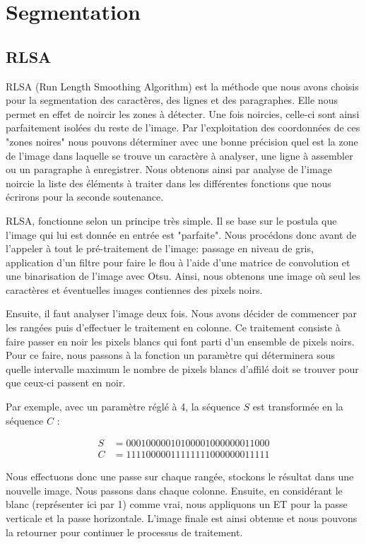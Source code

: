 \documentclass[11pt]{report}
\begin{document}
\section{Segmentation}

\subsection{RLSA}

RLSA (Run Length Smoothing Algorithm) est la méthode que nous avons choisis pour la segmentation des caractères, des lignes et des paragraphes. Elle nous permet en effet de noircir les zones à détecter. Une fois noircies, celle-ci sont ainsi parfaitement isolées du reste de l'image. Par l'exploitation des coordonnées de ces "zones noires" nous pouvons déterminer avec une bonne précision quel est la zone de l'image dans laquelle se trouve un caractère à analyser, une ligne à assembler ou un paragraphe à enregistrer. Nous obtenons ainsi par analyse de l'image noircie la liste des éléments à traiter dans les différentes fonctions que nous écrirons pour la seconde soutenance.

RLSA, fonctionne selon un principe très simple. Il se base sur le postula que l'image qui lui est donnée en entrée est "parfaite". Nous procédons donc avant de l'appeler à tout le pré-traitement de l'image: passage en niveau de gris, application d'un filtre pour faire le flou à l'aide d'une matrice de convolution et une binarisation de l'image avec Otsu. Ainsi, nous obtenons une image où seul les caractères et éventuelles images contiennes des pixels noirs.

Ensuite, il faut analyser l'image deux fois. Nous avons décider de commencer par les rangées puis d'effectuer le traitement en colonne. Ce traitement consiste à faire passer en noir les pixels blancs qui font parti d'un ensemble de pixels noirs. Pour ce faire, nous passons à la fonction un paramètre qui déterminera sous quelle intervalle maximum le nombre de pixels blancs d'affilé doit se trouver pour que ceux-ci passent en noir.

Par exemple, avec un paramètre réglé à 4, la séquence $S$ est transformée en la séquence $C$ :

\begin{align*}
S &= 00010000010100001000000011000\\
C &= 11110000011111111000000011111
\end{align*}

Nous effectuons donc une passe sur chaque rangée, stockons le résultat dans une nouvelle image. Nous passons dans chaque colonne. Ensuite, en considérant le blanc (représenter ici par 1) comme vrai, nous appliquons un ET pour la passe verticale et la passe horizontale. L'image finale est ainsi obtenue et nous pouvons la retourner pour continuer le processus de traitement.
\end{document}
